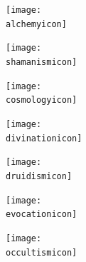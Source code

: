 
\begin{titlepage}
\begin{center}

\ifdef{\booktitle}{}{\newcommand{\booktitle}{Missing title}}
\ifdef{\version}{}{\newcommand{\version}{Missing version}}

{\titlefont\fontsize{40}{48}\selectfont\noindent{}

}

\vspace*{0.7cm}

\newcommand{\iconheight}{1.6cm}
\newcommand{\minipagewidth}{6cm}
\newcommand{\spacebetweeniconrows}{0.3cm}

\hfill\begin{minipage}[c]{\minipagewidth}
\begin{center}
\texttt{[image: \\alchemyicon]}

\vspace*{\spacebetweeniconrows}

\texttt{[image: \\shamanismicon]}

\vspace*{\spacebetweeniconrows}

\texttt{[image: \\cosmologyicon]}

\vspace*{\spacebetweeniconrows}

\texttt{[image: \\divinationicon]}

\vspace*{\spacebetweeniconrows}

\texttt{[image: \\druidismicon]}

\end{center}
\end{minipage}\begin{minipage}[c]{\minipagewidth}
\begin{center}
\texttt{[image: \\evocationicon]}

\vspace*{\spacebetweeniconrows}

\texttt{[image: \\occultismicon]}

\vspace*{\spacebetweeniconrows}


\end{center}
\end{minipage}
\end{center}
\end{titlepage}
